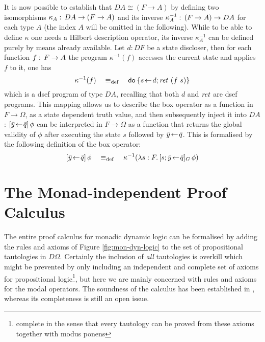 It is now possible to establish that $D A \cong (F \to A)$ by defining two
isomorphisms $\kappa_A :\, D A \to (F \to A)$ and its inverse $\kappa^{-1}_A :\, (F \to A) \to D
  A$ for each type $A$ (the index $A$ will be omitted in the following). While
to be able to define $\kappa$ one needs a Hilbert description operator, its inverse
$\kappa^{-1}_A$ can be defined purely by means already available. Let $d : DF$ be a
state discloser, then for each function $f :\, F \to A$ the program $\kappa^{-1}(f)$
accesses the current state and applies $f$ to it, \IE one has
\[
  \kappa^{-1}( f )\quad \equiv_{\mathrm{def}}\quad  \mathsf{do}\: \{s\!\gets\! d; \mathit{ret}~(f~s)\}
\]
which is a dsef program of type $D A$, recalling that both $d$ and $\mathit{ret}$ are
dsef programs. This mapping allows us to describe the box operator as a function
in $F \to \Omega$, \IE as a state dependent truth value, and then subsequently inject
it into $D A$: $[\bar y\!\gets\!\bar q]\,{\phi}$ can be interpreted in $F\to\Omega$ as a
function that returns the global validity of $\phi$ after executing the state $s$
followed by $\bar y\!\gets\!\bar q$. This is formalised by the following definition
of the box operator:
\[
[\bar y\!\gets\!\bar q]\,\phi \quad\equiv_{\mathrm{def}}\quad \kappa^{-1} ({\lambda s: F.\,[s; \bar
    y\!\gets\!\bar q]_G\,\phi})
\]

\section{The Monad-independent Proof Calculus}
\label{sec:monad-indep-calc}

The entire proof calculus for monadic dynamic logic can be formalised by adding
the rules and axioms of Figure \ref{fig:mon-dyn-logic} to the set of
propositional tautologies in $D\Omega$. Certainly the inclusion of \emph{all}
tautologies is overkill which might be prevented by only including an
independent and complete set of axioms for propositional logic\footnote{complete
  in the sense that every tautology can be proved from these axioms together
  with modus ponens}, but here we are mainly concerned with rules and axioms for
the modal operators. The soundness of the calculus has been established in
\cite{SchroederMossakowski:PDL}, whereas its completeness is still an open
issue.

